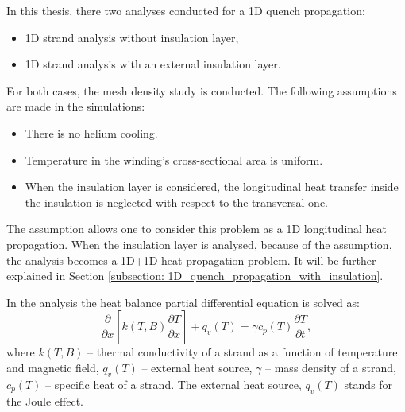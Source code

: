 
In this thesis, there two analyses conducted for a 1D quench propagation: 

\begin{itemize}
    \item 1D strand analysis without insulation layer,
    \item 1D strand analysis with an external insulation layer.
\end{itemize}

For both cases, the mesh density study is conducted. The following assumptions are made in the simulations: 

\begin{itemize}
    \item There is no helium cooling.
    \item Temperature in the winding's cross-sectional area is uniform.
    \item When the insulation layer is considered, the longitudinal heat transfer inside the insulation is neglected with respect to the transversal one.
\end{itemize}

The  assumption allows one to consider this problem as a 1D longitudinal heat propagation. When the insulation layer is analysed, because of the  assumption, the analysis becomes a 1D+1D heat propagation problem. It will be further explained in Section \ref{subsection: 1D_quench_propagation_with_insulation}.

In the analysis the heat balance partial differential equation is solved as:
\begin{equation}
    \frac{\partial}{\partial x}[k(T, B) \frac{\partial T}{\partial x}] + q_v(T) = \gamma c_p(T) \frac{\partial T}{\partial t},
\end{equation}
where $k(T, B)$ -- thermal conductivity of a strand as a function of temperature and magnetic field, $q_v(T)$ -- external heat source, $\gamma$ -- mass density of a strand, $c_p(T)$ -- specific heat of a strand. The external heat source, $q_v(T)$ stands for the Joule effect.